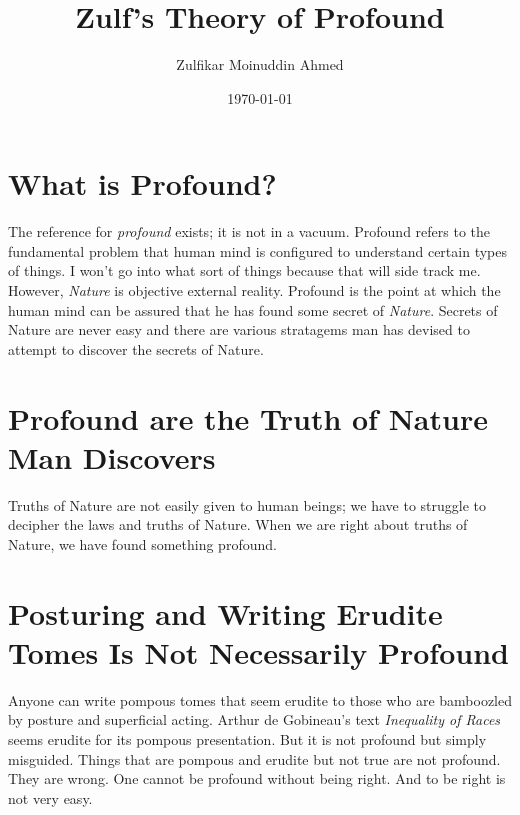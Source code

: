 \documentclass{amsart}
\title{Zulf's Theory of Profound}
\author{Zulfikar Moinuddin Ahmed}
\date{\today}
\begin{document}
\maketitle

\section{What is Profound?}

The reference for {\em profound} exists; it is not in a vacuum.  Profound refers to the fundamental problem that human mind is configured to understand certain types of things.  I won't go into what sort of things because that will side track me.  However, {\em Nature} is objective external reality.  Profound is the point at which the human mind can be assured that he has found some secret of {\em Nature}.  Secrets of Nature are never easy and there are various stratagems man has devised to attempt to discover the secrets of Nature.  

\section{Profound are the Truth of Nature Man Discovers}

Truths of Nature are not easily given to human beings; we have to struggle to decipher the laws and truths of Nature.  When we are right about truths of Nature, we have found something profound.

\section{Posturing and Writing Erudite Tomes Is Not Necessarily Profound}

Anyone can write pompous tomes that seem erudite to those who are bamboozled by posture and superficial acting.  Arthur de Gobineau's text {\em Inequality of Races} seems erudite for its pompous presentation.  But it is not profound but simply misguided.  Things that are pompous and erudite but not true are not profound.  They are wrong.  One cannot be profound without being right.  And to be right is not very easy.  
\end{document}
